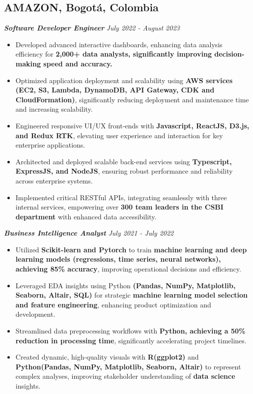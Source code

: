 \documentclass[10pt,a4paper]{article}
\begin{document}
\subsection*{AMAZON, Bogotá, Colombia}
{\fontsize{11}{12} \textbf{\textit{Software Developer Engineer}}} \hfill \textit{July 2022 - August 2023}
\begin{itemize}[noitemsep]
    \item Developed advanced interactive dashboards, enhancing data analysis efficiency for \textbf{2,000+ data analysts, significantly improving decision-making speed and accuracy.}
    \item Optimized application deployment and scalability using \textbf{AWS services (EC2, S3, Lambda, DynamoDB, API Gateway, CDK and CloudFormation)}, significantly reducing deployment and maintenance time and increasing scalability.
    \item Engineered responsive UI/UX front-ends with \textbf{Javascript, ReactJS, D3.js, and Redux RTK}, elevating user experience and interaction for key enterprise applications.
    \item Architected and deployed scalable back-end services using \textbf{Typescript, ExpressJS, and NodeJS}, ensuring robust performance and reliability across enterprise systems.
    \item Implemented critical RESTful APIs, integrating seamlessly with three internal services, empowering over \textbf{300 team leaders in the CSBI department} with enhanced data accessibility.
\end{itemize}

{\fontsize{11}{12} \textbf{\textit{Business Intelligence Analyst}}} \hfill \textit{July 2021 - July 2022}
\begin{itemize}[noitemsep]
    \item Utilized \textbf{Scikit-learn and Pytorch} to train \textbf{machine learning and deep learning models (regressions, time series, neural networks), achieving 85\% accuracy}, improving operational decisions and efficiency.
    \item Leveraged EDA insights using Python \textbf{(Pandas, NumPy, Matplotlib, Seaborn, Altair, SQL)} for strategic \textbf{machine learning model selection and feature engineering}, enhancing product optimization and development.
    \item Streamlined data preprocessing workflows with \textbf{Python, achieving a 50\% reduction in processing time}, significantly accelerating project timelines.
    \item Created dynamic, high-quality visuals with \textbf{R(ggplot2)} and \textbf{Python(Pandas, NumPy, Matplotlib, Seaborn, Altair)} to represent complex analyses, improving stakeholder understanding of \textbf{data science} insights.
\end{itemize}
\end{document}
